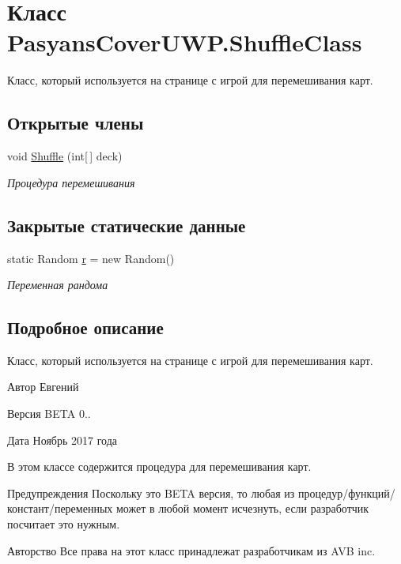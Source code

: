 \hypertarget{class_pasyans_cover_u_w_p_1_1_shuffle_class}{}\section{Класс Pasyans\+Cover\+U\+W\+P.\+Shuffle\+Class}
\label{class_pasyans_cover_u_w_p_1_1_shuffle_class}


Класс, который используется на странице с игрой для перемешивания карт.  


\subsection*{Открытые члены}
\begin{DoxyCompactItemize}
\item 
void \hyperlink{class_pasyans_cover_u_w_p_1_1_shuffle_class_ae78f430fb81a0ba09add8df54f669e65}{Shuffle} (int\mbox{[}$\,$\mbox{]} deck)
\begin{DoxyCompactList}\small\item\em Процедура перемешивания \end{DoxyCompactList}\end{DoxyCompactItemize}
\subsection*{Закрытые статические данные}
\begin{DoxyCompactItemize}
\item 
static Random \hyperlink{class_pasyans_cover_u_w_p_1_1_shuffle_class_a6e1016c56ea4d9242a9e158bae5a53d1}{r} = new Random()
\begin{DoxyCompactList}\small\item\em Переменная рандома \end{DoxyCompactList}\end{DoxyCompactItemize}


\subsection{Подробное описание}
Класс, который используется на странице с игрой для перемешивания карт. 

\begin{DoxyAuthor}{Автор}
Евгений 
\end{DoxyAuthor}
\begin{DoxyVersion}{Версия}
B\+E\+TA 0.. 
\end{DoxyVersion}
\begin{DoxyDate}{Дата}
Ноябрь 2017 года
\end{DoxyDate}
В этом классе содержится процедура для перемешивания карт. \begin{DoxyWarning}{Предупреждения}
Поскольку это B\+E\+TA версия, то любая из процедур/функций/констант/переменных может в любой момент исчезнуть, если разработчик посчитает это нужным. 
\end{DoxyWarning}
\begin{DoxyCopyright}{Авторство}
Все права на этот класс принадлежат разработчикам из A\+VB inc. 
\end{DoxyCopyright}


